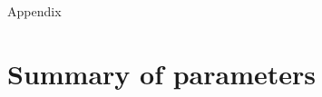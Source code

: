 \documentclass[12pt, oneside]{article}   	%
\begin{document}


\newpage{}

{\LARGE Appendix}

\appendix

\renewcommand{\theequation}{A\arabic{equation}}
\renewcommand{\thetable}{A\arabic{table}}
\setcounter{equation}{0}  %
\setcounter{figure}{0}
\setcounter{table}{0}

\section*{Summary of parameters}
\end{document}
